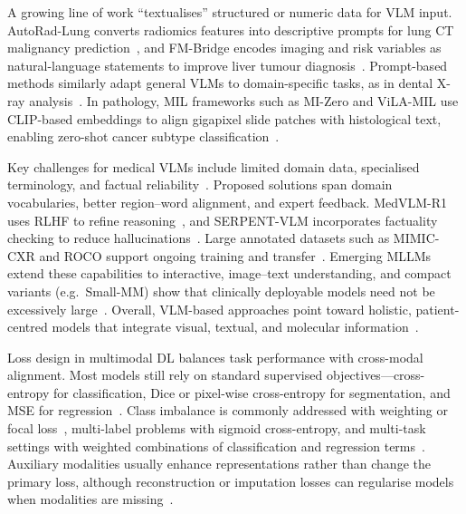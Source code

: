 \documentclass[final,british,a4paper,12pt]{phdthesis}
\begin{document}
A growing line of work “textualises” structured or numeric data for VLM input. AutoRad-Lung converts radiomics features into descriptive prompts for lung CT malignancy prediction~\cite{khademi2025autorad}, and FM-Bridge encodes imaging and risk variables as natural-language statements to improve liver tumour diagnosis~\cite{huang2025fmbridge}. Prompt-based methods similarly adapt general VLMs to domain-specific tasks, as in dental X-ray analysis~\cite{du2024prompting}. In pathology, MIL frameworks such as MI-Zero and ViLA-MIL use CLIP-based embeddings to align gigapixel slide patches with histological text, enabling zero-shot cancer subtype classification~\cite{lu2023mizero,shi2024vila}.

Key challenges for medical VLMs include limited domain data, specialised terminology, and factual reliability~\cite{ryu2025vlmreview}. Proposed solutions span domain vocabularies, better region–word alignment, and expert feedback. MedVLM-R1 uses RLHF to refine reasoning~\cite{pan2025medvlm}, and SERPENT-VLM incorporates factuality checking to reduce hallucinations~\cite{kapadnis2024serpent}. Large annotated datasets such as MIMIC-CXR and ROCO support ongoing training and transfer~\cite{huang2020fusion,haq2025mmml}. Emerging MLLMs extend these capabilities to interactive, image–text understanding, and compact variants (e.g.\ Small-MM) show that clinically deployable models need not be excessively large~\cite{nam2025multimodal,zambrano2025smallmm}. Overall, VLM-based approaches point toward holistic, patient-centred models that integrate visual, textual, and molecular information~\cite{haq2025mmml,zhoudeep}.

Loss design in multimodal DL balances task performance with cross-modal alignment. Most models still rely on standard supervised objectives—cross-entropy for classification, Dice or pixel-wise cross-entropy for segmentation, and MSE for regression~\cite{mohsen2022artificial}. Class imbalance is commonly addressed with weighting or focal loss~\cite{kline2022multimodal,haq2025mmml}, multi-label problems with sigmoid cross-entropy, and multi-task settings with weighted combinations of classification and regression terms~\cite{huang2020fusion}. Auxiliary modalities usually enhance representations rather than change the primary loss, although reconstruction or imputation losses can regularise models when modalities are missing~\cite{haq2025mmml}.
\end{document}
